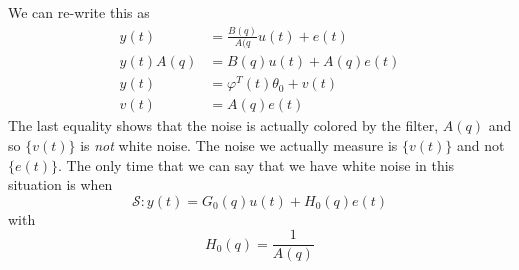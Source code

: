We can re-write this as
\begin{align*}
y(t) &= \frac{B(q)}{A(q}u(t) + e(t) \\
y(t)A(q) &= B(q)u(t) + A(q)e(t) \\
y(t) &= \varphi^T(t)\theta_0 + v(t) \\
v(t) &= A(q)e(t)
\end{align*}
The last equality shows that the noise is actually colored by the filter, $A(q)$ and so $\{v(t)\}$ is \textit{not} white noise. The noise we actually measure is $\{v(t)\}$ and not $\{e(t)\}$. The only time that we can say that we have white noise in this situation is when
$$\mathcal{S}: y(t) = G_0(q)u(t) + H_0(q)e(t)$$
with
$$H_0(q) = \frac{1}{A(q)}$$


% 

